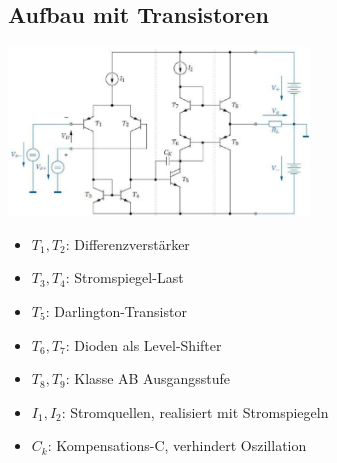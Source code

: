 	\subsection{Aufbau mit Transistoren}	
    \begin{minipage}{8cm}
   		\includegraphics[width=8cm]{images/OP-aus-Transistoren}
    \end{minipage}
    \begin{minipage}{8cm}
    	\begin{itemize}
    		\item $T_1,T_2$: Differenzverstärker
    		\item $T_3,T_4$: Stromspiegel-Last
    		\item $T_5$: Darlington-Transistor
    		\item $T_6,T_7$: Dioden als Level-Shifter
    		\item $T_8,T_9$: Klasse AB Ausgangsstufe
    		\item $I_1,I_2$: Stromquellen, realisiert mit Stromspiegeln
    		\item $C_k$: Kompensations-C, verhindert Oszillation
    	\end{itemize}
    \end{minipage}
    
    

